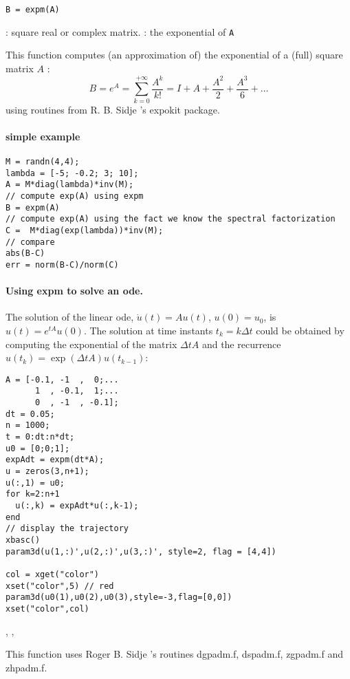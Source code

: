 
\begin{mandesc}
\end{mandesc}

\begin{calling_sequence}
\begin{verbatim}
B = expm(A)
\end{verbatim}
\end{calling_sequence}
\begin{parameters}
  \begin{varlist}
    :  square real or complex matrix.
    :  the exponential of \verb+A+
  \end{varlist}
\end{parameters}

\begin{mandescription}
This function computes (an approximation of) the exponential of a (full) square matrix $A$ :
$$
   B = e^A = \sum_{k=0}^{+\infty} \frac{A^k}{k !} = I + A + \frac{A^2}{2} + \frac{A^3}{6} + \dots
$$
using routines from R. B. Sidje 's expokit package.
\end{mandescription}

\begin{examples}

\paragraph{simple example}
\begin{Verbatim}
M = randn(4,4);
lambda = [-5; -0.2; 3; 10];
A = M*diag(lambda)*inv(M);
// compute exp(A) using expm 
B = expm(A)
// compute exp(A) using the fact we know the spectral factorization
C =  M*diag(exp(lambda))*inv(M);
// compare
abs(B-C)
err = norm(B-C)/norm(C)
\end{Verbatim}

\paragraph{Using expm to solve an ode.} The solution of the linear ode, $\dot{u}(t) = A u(t)$, $u(0)=u_0$,
is $u(t) = e^{tA} u(0)$. The solution at time instants $t_k = k \Delta t$ could be
obtained by computing the exponential of the matrix $\Delta t A$ and the recurrence 
$u(t_k) = \exp(\Delta t A) u(t_{k-1})$:  
\begin{Verbatim}
A = [-0.1, -1  ,  0;...
      1  , -0.1,  1;...
      0  , -1  , -0.1];
dt = 0.05;
n = 1000;
t = 0:dt:n*dt;
u0 = [0;0;1];
expAdt = expm(dt*A);
u = zeros(3,n+1);
u(:,1) = u0;
for k=2:n+1
  u(:,k) = expAdt*u(:,k-1);
end
// display the trajectory
xbasc()
param3d(u(1,:)',u(2,:)',u(3,:)', style=2, flag = [4,4])

col = xget("color")
xset("color",5) // red
param3d(u0(1),u0(2),u0(3),style=-3,flag=[0,0]) 
xset("color",col)
\end{Verbatim}
\end{examples}

\begin{manseealso}
  , ,   
\end{manseealso}

\begin{authors}
  This function uses Roger B. Sidje 's routines dgpadm.f, dspadm.f, zgpadm.f and zhpadm.f.
\end{authors}
